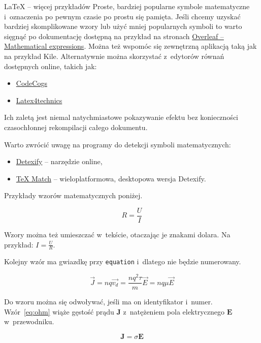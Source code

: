 \begin{easyappendix}{\LaTeX{} -- więcej przykładów}
Proste, bardziej popularne symbole matematyczne i~oznaczenia po pewnym czasie po prostu się pamięta. Jeśli chcemy uzyskać bardziej skomplikowane wzory lub użyć mniej popularnych symboli to warto sięgnąć po dokumentację dostępną na przykład na stronach \href{https://www.overleaf.com/learn/latex/Mathematical_expressions}{Overleaf -- Mathematical expressions}. Można też wspomóc się zewnętrzną aplikacją taką jak na przykład Kile. Alternatywnie można skorzystać z~edytorów równań dostępnych online, takich jak:
\begin{itemize}
	\item \href{https://latex.codecogs.com/eqneditor/editor.php}{CodeCogs}
	\item \href{https://www.latex4technics.com/}{Latex4technics}
\end{itemize}
Ich zaletą jest niemal natychmiastowe pokazywanie efektu bez konieczności czasochłonnej rekompilacji całego dokumentu.

Warto zwrócić uwagę na programy do detekcji symboli matematycznych:
\begin{itemize}
	\item \href{https://detexify.kirelabs.org/classify.html}{Detexify} -- narzędzie online,
	\item \href{https://github.com/zoeyfyi/TeX-Match}{TeX Match} -- wieloplatformowa, desktopowa wersja Detexify.
\end{itemize}

Przykłady wzorów matematycznych poniżej.

\begin{equation}
	R = \frac{U}{I}
\end{equation}

Wzory można też umieszczać w~tekście, otaczając je znakami dolara. Na przykład: $I=\frac{U}{R}$.

Kolejny wzór ma gwiazdkę przy \texttt{equation} i~dlatego nie będzie numerowany.

\begin{equation*}
	\vec{J} = nq \vec{v_d} =  \frac{nq^2 \tau}{m} \vec{E} = nq \mu \vec{E}    
\end{equation*}

Do wzoru można się odwoływać, jeśli ma on identyfikator i~numer. Wzór~\ref{eq:ohm} wiąże gęstość prądu $\pmb{J}$ z~natężeniem pola elektrycznego $\pmb{E}$ w~przewodniku.

\begin{equation}
	\pmb{J} = \sigma \pmb{E}
	\label{eq:ohm}
\end{equation}



\end{easyappendix}
